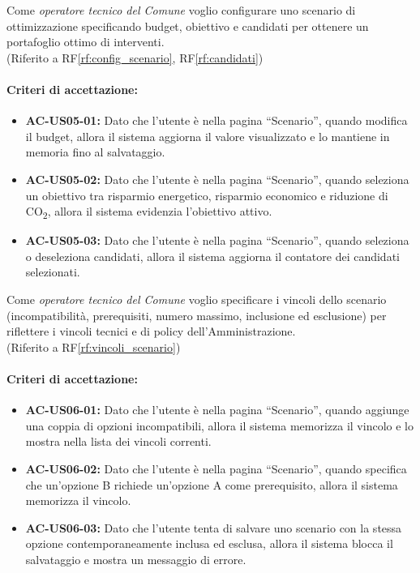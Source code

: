 \label{us:scenario}
Come \textit{operatore tecnico del Comune} voglio configurare uno scenario di ottimizzazione specificando budget, obiettivo e candidati per ottenere un portafoglio ottimo di interventi. \\ (Riferito a RF\ref{rf:config_scenario}, RF\ref{rf:candidati})

\paragraph{Criteri di accettazione:}
\begin{itemize}
    \item \textbf{AC-US05-01:} Dato che l'utente è nella pagina ``Scenario'', quando modifica il budget, allora il sistema aggiorna il valore visualizzato e lo mantiene in memoria fino al salvataggio.
    \item \textbf{AC-US05-02:} Dato che l'utente è nella pagina ``Scenario'', quando seleziona un obiettivo tra risparmio energetico, risparmio economico e riduzione di CO\textsubscript{2}, allora il sistema evidenzia l'obiettivo attivo.
    \item \textbf{AC-US05-03:} Dato che l'utente è nella pagina ``Scenario'', quando seleziona o deseleziona candidati, allora il sistema aggiorna il contatore dei candidati selezionati.
\end{itemize}

 \label{us:vincoli}
Come \textit{operatore tecnico del Comune} voglio specificare i vincoli dello scenario (incompatibilità, prerequisiti, numero massimo, inclusione ed esclusione) per riflettere i vincoli tecnici e di policy dell'Amministrazione. \\ (Riferito a RF\ref{rf:vincoli_scenario})

\paragraph{Criteri di accettazione:}
\begin{itemize}
    \item \textbf{AC-US06-01:} Dato che l'utente è nella pagina ``Scenario'', quando aggiunge una coppia di opzioni incompatibili, allora il sistema memorizza il vincolo e lo mostra nella lista dei vincoli correnti.
    \item \textbf{AC-US06-02:} Dato che l'utente è nella pagina ``Scenario'', quando specifica che un'opzione B richiede un'opzione A come prerequisito, allora il sistema memorizza il vincolo.
    \item \textbf{AC-US06-03:} Dato che l'utente tenta di salvare uno scenario con la stessa opzione contemporaneamente inclusa ed esclusa, allora il sistema blocca il salvataggio e mostra un messaggio di errore.
\end{itemize}

